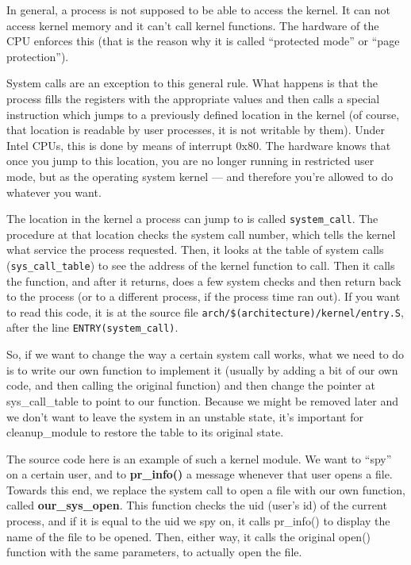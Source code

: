 \documentclass[10pt, oneside]{book}
\begin{document}
In general, a process is not supposed to be able to access the kernel.
It can not access kernel memory and it can't call kernel functions.
The hardware of the CPU enforces this (that is the reason why it is called ``protected mode'' or ``page protection'').

System calls are an exception to this general rule.
What happens is that the process fills the registers with the appropriate values and then calls a special instruction which jumps to a previously defined location in the kernel (of course, that location is readable by user processes, it is not writable by them).
Under Intel CPUs, this is done by means of interrupt 0x80. The hardware knows that once you jump to this location, you are no longer running in restricted user mode, but as the operating system kernel --- and therefore you're allowed to do whatever you want.

The location in the kernel a process can jump to is called \verb|system_call|.
The procedure at that location checks the system call number, which tells the kernel what service the process requested.
Then, it looks at the table of system calls (\verb|sys_call_table|) to see the address of the kernel function to call.
Then it calls the function, and after it returns, does a few system checks and then return back to the process (or to a different process, if the process time ran out).
If you want to read this code, it is at the source file \verb|arch/$(architecture)/kernel/entry.S|, after the line \verb|ENTRY(system_call)|.

So, if we want to change the way a certain system call works, what we need to do is to write our own function to implement it (usually by adding a bit of our own code, and then calling the original function) and then change the pointer at sys\_call\_table to point to our function.
Because we might be removed later and we don't want to leave the system in an unstable state, it's important for cleanup\_module to restore the table to its original state.

The source code here is an example of such a kernel module.
We want to ``spy'' on a certain user, and to \textbf{pr\_info()} a message whenever that user opens a file.
Towards this end, we replace the system call to open a file with our own function, called \textbf{our\_sys\_open}.
This function checks the uid (user's id) of the current process, and if it is equal to the uid we spy on, it calls pr\_info() to display the name of the file to be opened.
Then, either way, it calls the original open() function with the same parameters, to actually open the file.
\end{document}

